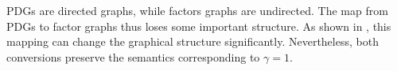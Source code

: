 \documentclass[letterpaper]{article} %
\theoremstyle{plain}
\theoremstyle{definition}
\theoremstyle{remark}
\newcommand\vfull[1]{{\color{vfullcolor} #1}}
\renewcommand\vfull[1]{} %
\newcommand{\dg}[1]{\mathbdcal{#1}}
\begin{document}
PDGs are directed graphs, while factors graphs are undirected. The
map from PDGs to factor graphs thus loses some important structure.
As shown in
\vfull{
    \Cref{fig:fg2PDG,fig:fg-intro-examples}
}%
,
this mapping can change the graphical structure significantly.
Nevertheless,
both conversions preserve the semantics corresponding to $\gamma=1$.
\end{document}

